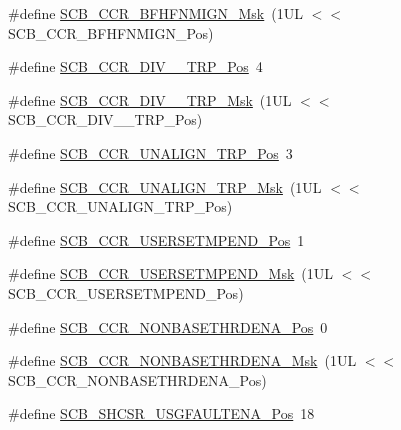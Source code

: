 \begin{DoxyCompactItemize}
\item 
\#define \mbox{\hyperlink{group___c_m_s_i_s___s_c_b_ga89a28cc31cfc7d52d9d7a8fcc69c7eac}{S\+C\+B\+\_\+\+C\+C\+R\+\_\+\+B\+F\+H\+F\+N\+M\+I\+G\+N\+\_\+\+Msk}}~(1\+U\+L $<$$<$ S\+C\+B\+\_\+\+C\+C\+R\+\_\+\+B\+F\+H\+F\+N\+M\+I\+G\+N\+\_\+\+Pos)
\item 
\#define \mbox{\hyperlink{group___c_m_s_i_s___s_c_b_gac8d512998bb8cd9333fb7627ddf59bba}{S\+C\+B\+\_\+\+C\+C\+R\+\_\+\+D\+I\+V\+\_\+\_\+\+T\+R\+P\+\_\+\+Pos}}~4
\item 
\#define \mbox{\hyperlink{group___c_m_s_i_s___s_c_b_gabb9aeac71b3abd8586d0297070f61dcb}{S\+C\+B\+\_\+\+C\+C\+R\+\_\+\+D\+I\+V\+\_\+\_\+\+T\+R\+P\+\_\+\+Msk}}~(1\+U\+L $<$$<$ S\+C\+B\+\_\+\+C\+C\+R\+\_\+\+D\+I\+V\+\_\+\_\+\+T\+R\+P\+\_\+\+Pos)
\item 
\#define \mbox{\hyperlink{group___c_m_s_i_s___s_c_b_gac4e4928b864ea10fc24dbbc57d976229}{S\+C\+B\+\_\+\+C\+C\+R\+\_\+\+U\+N\+A\+L\+I\+G\+N\+\_\+\+T\+R\+P\+\_\+\+Pos}}~3
\item 
\#define \mbox{\hyperlink{group___c_m_s_i_s___s_c_b_ga68c96ad594af70c007923979085c99e0}{S\+C\+B\+\_\+\+C\+C\+R\+\_\+\+U\+N\+A\+L\+I\+G\+N\+\_\+\+T\+R\+P\+\_\+\+Msk}}~(1\+U\+L $<$$<$ S\+C\+B\+\_\+\+C\+C\+R\+\_\+\+U\+N\+A\+L\+I\+G\+N\+\_\+\+T\+R\+P\+\_\+\+Pos)
\item 
\#define \mbox{\hyperlink{group___c_m_s_i_s___s_c_b_ga789e41f45f59a8cd455fd59fa7652e5e}{S\+C\+B\+\_\+\+C\+C\+R\+\_\+\+U\+S\+E\+R\+S\+E\+T\+M\+P\+E\+N\+D\+\_\+\+Pos}}~1
\item 
\#define \mbox{\hyperlink{group___c_m_s_i_s___s_c_b_ga4cf59b6343ca962c80e1885710da90aa}{S\+C\+B\+\_\+\+C\+C\+R\+\_\+\+U\+S\+E\+R\+S\+E\+T\+M\+P\+E\+N\+D\+\_\+\+Msk}}~(1\+U\+L $<$$<$ S\+C\+B\+\_\+\+C\+C\+R\+\_\+\+U\+S\+E\+R\+S\+E\+T\+M\+P\+E\+N\+D\+\_\+\+Pos)
\item 
\#define \mbox{\hyperlink{group___c_m_s_i_s___s_c_b_gab4615f7deb07386350365b10240a3c83}{S\+C\+B\+\_\+\+C\+C\+R\+\_\+\+N\+O\+N\+B\+A\+S\+E\+T\+H\+R\+D\+E\+N\+A\+\_\+\+Pos}}~0
\item 
\#define \mbox{\hyperlink{group___c_m_s_i_s___s_c_b_gafe0f6be81b35d72d0736a0a1e3b4fbb3}{S\+C\+B\+\_\+\+C\+C\+R\+\_\+\+N\+O\+N\+B\+A\+S\+E\+T\+H\+R\+D\+E\+N\+A\+\_\+\+Msk}}~(1\+U\+L $<$$<$ S\+C\+B\+\_\+\+C\+C\+R\+\_\+\+N\+O\+N\+B\+A\+S\+E\+T\+H\+R\+D\+E\+N\+A\+\_\+\+Pos)
\item 
\#define \mbox{\hyperlink{group___c_m_s_i_s___s_c_b_gae71949507636fda388ec11d5c2d30b52}{S\+C\+B\+\_\+\+S\+H\+C\+S\+R\+\_\+\+U\+S\+G\+F\+A\+U\+L\+T\+E\+N\+A\+\_\+\+Pos}}~18
\item 
$$
\end{DoxyCompactItemize}
